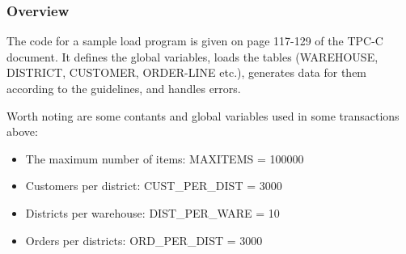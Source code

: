 \subsubsection {Overview}

The code for a sample load program is given on page 117-129 of the TPC-C document. It defines the global variables, loads the tables (WAREHOUSE, DISTRICT, CUSTOMER, ORDER-LINE etc.), generates data for them according to the guidelines, and handles errors.

Worth noting are some contants and global variables used in some transactions above:

\begin{itemize}
    \item The maximum number of items: MAXITEMS = 100000
    \item Customers per district: CUST\_PER\_DIST = 3000
    \item Districts per warehouse: DIST\_PER\_WARE = 10
    \item Orders per districts: ORD\_PER\_DIST = 3000 
\end{itemize}
    
